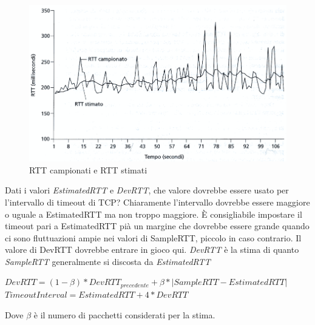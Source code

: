 \documentclass[11pt,a4paper]{book}
\begin{document}
\begin{figure}
	\includegraphics[scale=0.6]{img/032.png}
	\caption{RTT campionati e RTT stimati}
\end{figure}
Dati i valori \emph{EstimatedRTT} e \emph{DevRTT}, che valore dovrebbe essere usato per l'intervallo di timeout di TCP? Chiaramente l'intervallo dovrebbe essere maggiore o uguale a EstimatedRTT ma non troppo maggiore. È consigliabile impostare il timeout pari a EstimatedRTT pià un margine che dovrebbe essere grande quando ci sono fluttuazioni ampie nei valori di SampleRTT, piccolo in caso contrario. Il valore di DevRTT dovrebbe entrare in gioco qui. \emph{DevRTT} è la stima di quanto \emph{SampleRTT} generalmente si discosta da \emph{EstimatedRTT}
\begin{center}
	$DevRTT = (1 - \beta)*DevRTT_{precedente} + \beta*|SampleRTT - EstimatedRTT|$
	\textbf{$TimeoutInterval = EstimatedRTT + 4 * DevRTT$}
\end{center}
Dove $\beta$ è il numero di pacchetti considerati per la stima.
\end{document}
